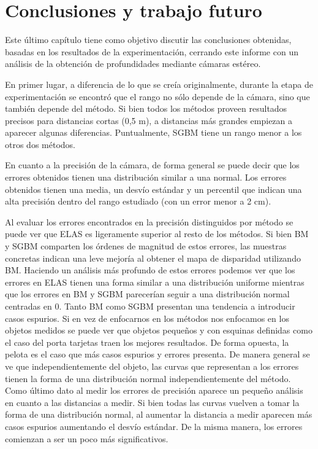 \documentclass[11pt,a4paper,titlepage]{article}
\begin{document}
\newpage

\section{Conclusiones y trabajo futuro}

Este último capítulo tiene como objetivo discutir las conclusiones obtenidas, basadas en los resultados de la experimentación, cerrando este informe con un análisis de la obtención de profundidades mediante cámaras estéreo.

En primer lugar, a diferencia de lo que se creía originalmente, durante la etapa de experimentación se encontró que el rango no sólo depende de la cámara, sino que también depende del método. Si bien todos los métodos proveen resultados precisos para distancias cortas (0,5 m), a distancias más grandes empiezan a aparecer algunas diferencias. Puntualmente, SGBM tiene un rango menor a los otros dos métodos.

En cuanto a la precisión de la cámara, de forma general se puede decir que los errores obtenidos tienen una distribución similar a una normal. Los errores obtenidos tienen una media, un desvío estándar y un percentil que indican una alta precisión dentro del rango estudiado (con un error menor a 2 cm).

Al evaluar los errores encontrados en la precisión distinguidos por método se puede ver que ELAS es ligeramente superior al resto de los métodos. Si bien BM y SGBM comparten los órdenes de magnitud de estos errores, las muestras concretas indican una leve mejoría al obtener el mapa de disparidad utilizando BM.
Haciendo un análisis más profundo de estos errores podemos ver que los errores en ELAS tienen una forma similar a una distribución uniforme mientras que los errores en BM y SGBM parecerían seguir a una distribución normal centradas en 0. Tanto BM como SGBM presentan una tendencia a introducir casos espurios.
Si en vez de enfocarnos en los métodos nos enfocamos en los objetos medidos se puede ver que objetos pequeños y con esquinas definidas como el caso del porta tarjetas traen los mejores resultados. De forma opuesta, la pelota es el caso que más casos espurios y errores presenta. De manera general se ve que independientemente del objeto, las curvas que representan a los errores tienen la forma de una distribución normal independientemente del método.
Como último dato al medir los errores de precisión aparece un pequeño análisis en cuanto a las distancias a medir. Si bien todas las curvas vuelven a tomar la forma de una distribución normal, al aumentar la distancia a medir aparecen más casos espurios aumentando el desvío estándar. De la misma manera, los errores comienzan a ser un poco más significativos.
\end{document}

